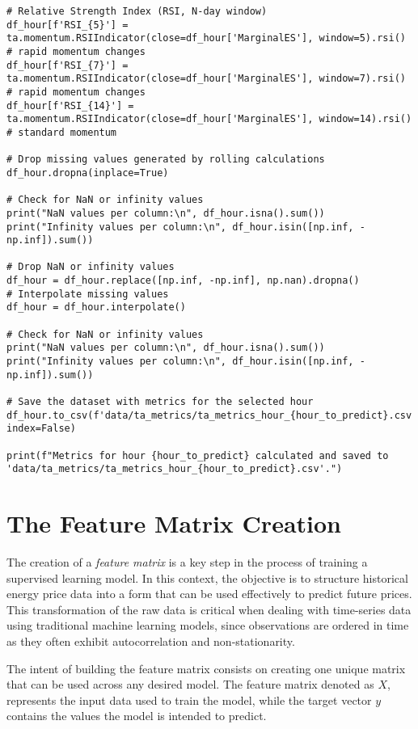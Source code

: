 \documentclass[12pt]{report} %
\begin{document}
\begin{lstlisting}
# Relative Strength Index (RSI, N-day window)
df_hour[f'RSI_{5}'] = ta.momentum.RSIIndicator(close=df_hour['MarginalES'], window=5).rsi() # rapid momentum changes
df_hour[f'RSI_{7}'] = ta.momentum.RSIIndicator(close=df_hour['MarginalES'], window=7).rsi() # rapid momentum changes
df_hour[f'RSI_{14}'] = ta.momentum.RSIIndicator(close=df_hour['MarginalES'], window=14).rsi() # standard momentum

# Drop missing values generated by rolling calculations
df_hour.dropna(inplace=True)

# Check for NaN or infinity values
print("NaN values per column:\n", df_hour.isna().sum())
print("Infinity values per column:\n", df_hour.isin([np.inf, -np.inf]).sum())

# Drop NaN or infinity values
df_hour = df_hour.replace([np.inf, -np.inf], np.nan).dropna()
# Interpolate missing values
df_hour = df_hour.interpolate()

# Check for NaN or infinity values
print("NaN values per column:\n", df_hour.isna().sum())
print("Infinity values per column:\n", df_hour.isin([np.inf, -np.inf]).sum())

# Save the dataset with metrics for the selected hour
df_hour.to_csv(f'data/ta_metrics/ta_metrics_hour_{hour_to_predict}.csv', index=False)

print(f"Metrics for hour {hour_to_predict} calculated and saved to 'data/ta_metrics/ta_metrics_hour_{hour_to_predict}.csv'.")
\end{lstlisting}

\section{The Feature Matrix Creation}

The creation of a \textit{feature matrix} is a key step in the process of training a supervised learning model. In this context, the objective is to structure historical energy price data into a form that can be used effectively to predict future prices. This transformation of the raw data is critical when dealing with time-series data using traditional machine learning models, since observations are ordered in time as they often exhibit autocorrelation and non-stationarity.

The intent of building the feature matrix consists on creating one unique matrix that can be used across any desired model. The feature matrix denoted as $\mathit{X}$, represents the input data used to train the model, while the target vector $\mathit{y}$ contains the values the model is intended to predict.
\end{document}
